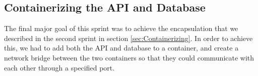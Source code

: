 \subsection{Containerizing the API and Database}
The final major goal of this sprint was to achieve the encapsulation that we described in the second sprint in section \ref{sec:Containerizing}. 
In order to achieve this, we had to add both the API and database to a container, and create a network bridge between the two containers so that they could communicate with each other through a specified port.